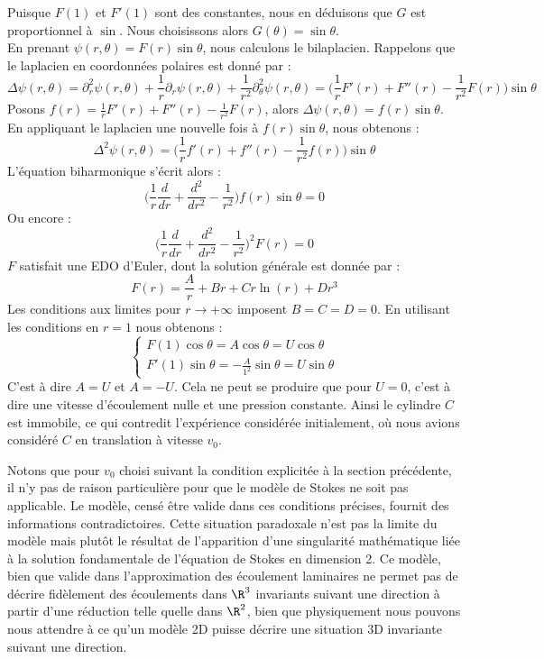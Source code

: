 Puisque $F(1)$ et $F'(1)$ sont des constantes, nous en déduisons que $G$ est proportionnel à $\sin$.
Nous choisissons alors $G(\theta) = \sin \theta$.\\
En prenant $\psi(r,\theta) = F(r)\sin \theta$, nous calculons le bilaplacien. Rappelons que le laplacien en coordonnées polaires est donné par :
$$\Delta \psi(r,\theta) = \partial_{r}^2\psi(r,\theta) + \frac{1}{r}\partial_{r}\psi(r,\theta) + \frac{1}{r^2}\partial_{\theta}^2\psi(r,\theta) = \bigg( \frac{1}{r}F'(r) + F''(r) - \frac{1}{r^2}F(r) \bigg) \sin \theta $$
Posons $f(r) = \frac{1}{r}F'(r) + F''(r) - \frac{1}{r^2}F(r) $, alors $\Delta \psi(r,\theta) = f(r)\sin \theta$.
En appliquant le laplacien une nouvelle fois à $f(r)\sin \theta$, nous obtenons :
$$ \Delta^2 \psi(r,\theta) = \bigg( \frac{1}{r}f'(r) + f''(r) - \frac{1}{r^2}f(r) \bigg) \sin \theta $$
L'équation biharmonique s'écrit alors :
$$ \bigg( \frac{1}{r} \frac{d}{dr} + \frac{d^2}{dr^2} - \frac{1}{r^2} \bigg) f(r)\sin \theta = 0 $$
Ou encore :
$$ \bigg( \frac{1}{r} \frac{d}{dr} + \frac{d^2}{dr^2} - \frac{1}{r^2} \bigg)^2 F(r) = 0 $$
$F$ satisfait une EDO d'Euler, dont la solution générale est donnée par \cite{Galdi} :
$$F(r) = \frac{A}{r} + Br + Cr\ln(r) + Dr^3 $$
Les conditions aux limites pour $r \to +\infty$ imposent $B = C = D = 0$.
En utilisant les conditions en $r=1$ nous obtenons :
$$\begin{cases}
    F(1)\cos \theta = A \cos \theta = U \cos \theta \\
    F'(1) \sin \theta = - \frac{A}{1^2} \sin \theta = U \sin \theta
\end{cases}$$
C'est à dire $A = U$ et $A = -U$. Cela ne peut se produire que pour $U = 0$, c'est à dire une vitesse d'écoulement nulle et une pression constante.
Ainsi le cylindre $C$ est immobile, ce qui contredit l'expérience considérée initialement, où nous avions considéré $C$ en translation à vitesse $v_0$.

\vspace{1em}

Notons que pour $v_0$ choisi suivant la condition explicitée à la section précédente, il n'y pas de raison particulière pour que le modèle de Stokes ne soit 
pas applicable. Le modèle, censé être valide dans ces conditions précises, fournit des informations contradictoires. Cette situation paradoxale n'est pas la limite
du modèle mais plutôt le résultat de l'apparition d'une singularité mathématique liée à la solution fondamentale de l'équation de Stokes en dimension 2. Ce modèle, bien que valide 
dans l'approximation des écoulement laminaires ne permet pas de décrire fidèlement des écoulements dans $\R^3$ invariants suivant une direction à partir d'une réduction telle quelle dans $\R^2$, bien que physiquement 
nous pouvons nous attendre à ce qu'un modèle 2D puisse décrire une situation 3D invariante suivant une direction.

